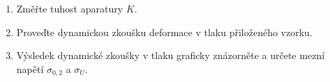 \documentclass[protokol.tex]{subfiles}
\begin{document}
\begin{enumerate}
\item Změřte tuhost aparatury $K$.
\item Proveďte dynamickou zkoušku deformace v tlaku přiloženého vzorku.
\item Výsledek dynamické zkoušky v tlaku graficky znázorněte a určete mezní napětí $\sigma_{0,2}$ a $\sigma_U$.
\end{enumerate}
\end{document}
